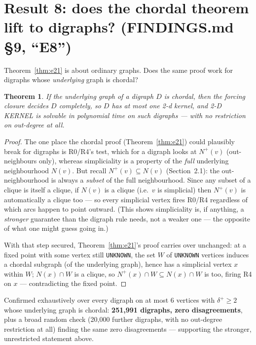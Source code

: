 \documentclass[11pt]{article}
\theoremstyle{plain}
\newtheorem{theorem}{Theorem}[section]
\theoremstyle{definition}
\theoremstyle{remark}
\begin{document}
\section{Result 8: does the chordal theorem lift to digraphs? (FINDINGS.md \S9, ``E8'')}
\label{sec:e8}

Theorem~\ref{thm:e21} is about ordinary graphs. Does the same proof work for digraphs
whose \emph{underlying} graph is chordal?

\begin{theorem}
If the underlying graph of a digraph $D$ is chordal, then the forcing closure decides
$D$ completely, so $D$ has at most one 2-d kernel, and 2-D KERNEL is solvable in
polynomial time on such digraphs — with \emph{no} restriction on out-degree at all.
\end{theorem}

\begin{proof}
The one place the chordal proof (Theorem~\ref{thm:e21}) could plausibly break for
digraphs is R0/R4's test, which for a digraph looks at $N^+(v)$ (out-neighbours only),
whereas simpliciality is a property of the \emph{full} underlying neighbourhood
$N(v)$. But recall $N^+(v) \subseteq N(v)$ (Section~2.1): the out-neighbourhood is
always a \emph{subset} of the full neighbourhood. Since any subset of a clique is
itself a clique, if $N(v)$ is a clique (i.e.\ $v$ is simplicial) then $N^+(v)$ is
automatically a clique too — so every simplicial vertex fires R0/R4 regardless of
which arcs happen to point outward. (This shows simpliciality is, if anything, a
\emph{stronger} guarantee than the digraph rule needs, not a weaker one — the opposite
of what one might guess going in.)

With that step secured, Theorem~\ref{thm:e21}'s proof carries over unchanged: at a
fixed point with some vertex still \texttt{UNKNOWN}, the set $W$ of \texttt{UNKNOWN}
vertices induces a chordal subgraph (of the underlying graph), hence has a simplicial
vertex $x$ within $W$; $N(x) \cap W$ is a clique, so $N^+(x) \cap W \subseteq N(x)
\cap W$ is too, firing R4 on $x$ — contradicting the fixed point.
\end{proof}

Confirmed exhaustively over every digraph on at most 6 vertices with $\delta^+ \ge 2$
whose underlying graph is chordal: \textbf{251{,}991 digraphs, zero disagreements},
plus a broad random check (20{,}000 further digraphs, with no out-degree restriction at
all) finding the same zero disagreements — supporting the stronger, unrestricted
statement above.
\end{document}
